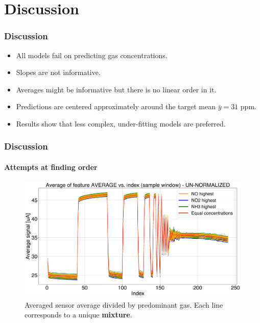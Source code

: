 \documentclass{beamer}
\begin{document}
\section{Discussion}
\begin{frame}
	\frametitle{Discussion}
	
	\begin{itemize}
		\item All models fail on predicting gas concentrations.
		\item Slopes are not informative.
		\item Averages might be informative but there is no linear order in it.
		\item Predictions are centered approximately  around the target mean $\bar{y} = 31$ ppm.
		\item Results show that less complex, under-fitting models are preferred.
		
	\end{itemize} 	
	
\end{frame}


\begin{frame}
	\frametitle{Discussion}
	\framesubtitle{Attempts at finding order}
		\begin{figure}
			\includegraphics[width=1\linewidth]{../../figures/order1.png}
			\caption{Averaged sensor average divided by predominant gas. Each line corresponds to a unique \textbf{mixture}.}
		\end{figure}
\end{frame}
\end{document}

